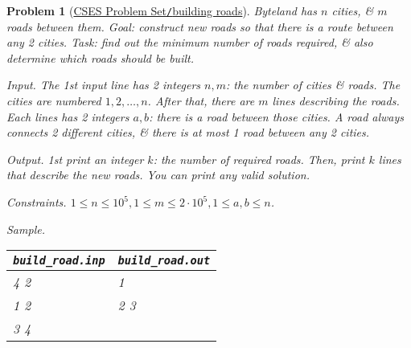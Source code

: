 \documentclass{article}
\newtheorem{problem}{Problem}
\begin{document}
\begin{problem}[\href{https://cses.fi/problemset/task/1666}{CSES Problem Set{\tt/}building roads}]
	Byteland has $n$ cities, \& $m$ roads between them. Goal: construct new roads so that there is a route between any 2 cities. Task: find out the minimum number of roads required, \& also determine which roads should be built.
	\item {\sf Input.} The 1st input line has 2 integers $n,m$: the number of cities \& roads. The cities are numbered $1,2,\ldots,n$. After that, there are $m$ lines describing the roads. Each lines has 2 integers $a,b$: there is a road between those cities. A road always connects 2 different cities, \& there is at most 1 road between any 2 cities.
	\item {\sf Output.} 1st print an integer $k$: the number of required roads. Then, print $k$ lines that describe the new roads. You can print any valid solution.
	\item {\sf Constraints.} $1\le n\le10^5,1\le m\le2\cdot10^5,1\le a,b\le n$.
	\item {\sf Sample.}
	\begin{table}[H]
		\centering
		\begin{tabular}{|l|l|}
			\hline
			\verb|build_road.inp| & \verb|build_road.out| \\
			\hline
			4 2 & 1 \\
			1 2 & 2 3 \\
			3 4 &  \\
			\hline
		\end{tabular}
	\end{table}
\end{problem}
\end{document}
